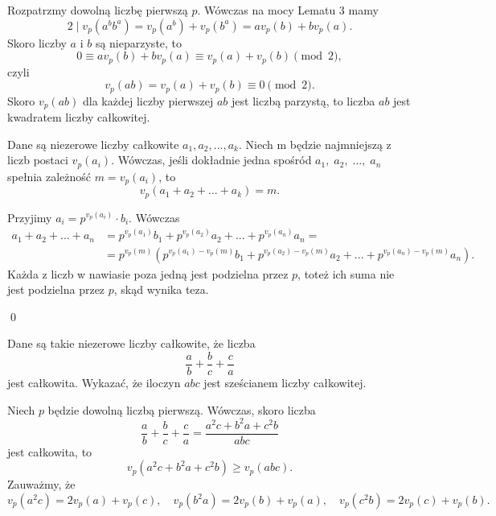 \vspace{5px}


\noindent
Rozpatrzmy dowolną liczbę pierwszą $p$. Wówczas na mocy Lematu $3$ mamy
\[
	2 \mid v_p(a^bb^a) = v_p(a^b) + v_p(b^a) = av_p(b) + bv_p(a).
\]
Skoro liczby $a$ i $b$ są nieparzyste, to
\[
	0 \equiv av_p(b) + bv_p(a) \equiv v_p(a) + v_p(b) \pmod{2},
\]
czyli
\[
	v_p(ab) = v_p(a) + v_p(b) \equiv 0 \pmod{2}.
\]
Skoro $v_p(ab)$ dla każdej liczby pierwszej $ab$ jest liczbą parzystą, to liczba $ab$ jest kwadratem liczby całkowitej.


\noindent
Dane są niezerowe liczby całkowite $a_1, a_2, ..., a_k$. Niech m będzie najmniejszą z liczb postaci $v_p(a_i)$. Wówczas, jeśli dokładnie jedna spośród $a_1, \; a_2, \; ..., \; a_n$ spełnia zależność $m = v_p(a_i)$, to
\[
	v_p(a_1 + a_2 + ... + a_k) = m.
\]

\vspace{5px}


\noindent
Przyjimy $a_i = p^{v_p(a_i)} \cdot b_i$. Wówczas
\begin{align*}
	a_1 + a_2 + ... + a_n &= p^{v_p(a_1)}b_1 + p^{v_p(a_2)}a_2 + ... + p^{v_p(a_n)}a_n = \\
	&= p^{v_p(m)}\left(p^{v_p(a_1) - v_p(m)}b_1 + p^{v_p(a_2) - v_p(m)}a_2 + ... + p^{v_p(a_n) - v_p(m)}a_n\right).
\end{align*}
Każda z liczb w nawiasie poza jedną jest podzielna przez $p$, toteż ich suma nie jest podzielna przez $p$, skąd wynika teza.

\qed


\noindent
Dane są takie niezerowe liczby całkowite, że liczba
\[
	\frac{a}{b} + \frac{b}{c} + \frac{c}{a}
\]
jest całkowita. Wykazać, że iloczyn $abc$ jest sześcianem liczby całkowitej.

\vspace{5px}


\noindent
Niech $p$ będzie dowolną liczbą pierwszą. Wówczas, skoro liczba
\[
	\frac{a}{b} + \frac{b}{c} + \frac{c}{a} = \frac{a^2c + b^2a + c^2b}{abc}
\]
jest całkowita, to
\[
	v_p(a^2c + b^2a + c^2b) \geqslant v_p(abc).
\]
Zauważmy, że
\[
	v_p(a^2c) = 2v_p(a) + v_p(c), \quad v_p(b^2a) = 2v_p(b) + v_p(a), \quad v_p(c^2b) = 2v_p(c) + v_p(b).
\]


